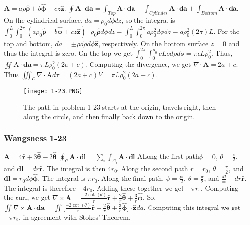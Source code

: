 \documentclass[oneside]{book}
\theoremstyle{definition}
\newcommand*\B[1]{\mathbf{#1}}
\newcommand*\Bh[1]{\mathbf{\hat{#1}}}
\begin{document}
$\B{A} = a\rho\Bh{\rho}+b\Bh{\phi}+cz\Bh{z}$. $\oint \B{A}\cdot \B{da} = \int_{Top} \B{A}\cdot \B{da}+\int_{Cylinder} \B{A}\cdot \B{da} + \int_{Bottom} \B{A}\cdot \B{da}$. On the cylindrical surface, $da = \rho_0 d\phi dz$, so the integral is $\int_{0}^{L}\int_{0}^{2\pi}(a\rho_0\Bh{\rho}+b\Bh{\phi}+cz\Bh{z})\cdot \rho_0 \Bh{\rho}d\phi dz = \int_{0}^{L}\int_{0}^{2\pi}a\rho_0^2 d\phi dz = a\rho_0^2(2\pi)L$. For the top and bottom, $da = \pm \rho d\rho d\phi \Bh{z}$, respectively. On the bottom surface $z=0$ and thus the integral is zero. On the top we get $\int_{0}^{2\pi}\int_{0}^{\rho_0}cL\rho d\rho d\phi = \pi cL \rho_0^2$. Thus, $\oiint \B{A}\cdot \B{da} = \pi L \rho_0^2(2a+c)$. Computing the divergence, we get $\nabla \cdot \B{A} = 2a+c$. Thus $\iiint_C \nabla \cdot \B{A} d\tau = (2a+c) V = \pi L \rho_0^2(2a+c)$.

\begin{figure}[htbp]
\begin{center}
\texttt{[image: 1-23.PNG]}
\caption{The path in problem 1-23 starts at the origin, travels right, then along the circle, and then finally back down to the origin.}
\label{default}
\end{center}
\end{figure}

\subsubsection{Wangsness 1-23}

$\B{A} = 4\Bh{r}+3\Bh{\theta}-2\Bh{\theta}$
$\oint_{C}\B{A}\cdot \B{dl} = \sum_{i} \int_{C_i} \B{A}\cdot \B{dl}$
ALong the first path$ \phi=0,\ \theta = \frac{\pi}{2}$, and $\B{dl} = dr\Bh{r}$. The integral is then $4r_0$. Along the second path $r=r_0$, $\theta = \frac{\pi}{2}$, and $\B{dl} = r_0 d\phi \Bh{\phi}$. The integral is $\pi r_0$. Along the final path, $\phi = \frac{pi}{2}$, $\theta = \frac{\pi}{2}$, and $ \frac{dl} = -dr \Bh{r}$. The integral is therefore $-4r_0$. Adding these together we get $-\pi r_0$. Computing the curl, we get $\nabla \times \B{A} = \frac{-2\cot(\theta)}{r}\Bh{r}+\frac{2}{r}\Bh{\theta}+\frac{3}{r}\Bh{\phi}$. So, $\iint \nabla \times \B{A} \cdot \B{da} = \iint \big[\frac{-2\cot(\theta)}{r}\Bh{r}+\frac{2}{r}\Bh{\theta}+\frac{3}{r}\Bh{\phi}\big]\cdot \Bh{z} da$. Computing this integral we get $-\pi r_0$, in agreement with Stokes' Theorem.
\end{document}
